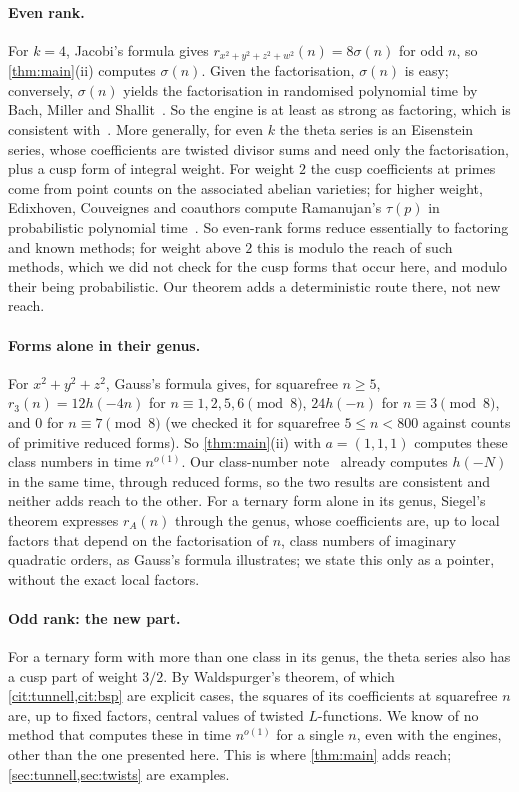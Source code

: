 \documentclass[10pt]{amsart}
\theoremstyle{plain}
\theoremstyle{definition}
\theoremstyle{remark}
\numberwithin{equation}{section}
\newcommand{\nr}{\dag}%
\begin{document}
\paragraph{Even rank.} For $k=4$, Jacobi's formula gives $r_{x^2+y^2+z^2+w^2}(n)=8\sigma(n)$ for odd $n$, so
\cref{thm:main}(ii) computes $\sigma(n)$. Given the factorisation, $\sigma(n)$ is easy; conversely,
$\sigma(n)$ yields the factorisation in randomised polynomial time by Bach, Miller and Shallit~\cite{BMS86}\nr.
So the engine is at least as strong as factoring, which is consistent with~\cite{RR26}. More generally, for even
$k$ the theta series is an Eisenstein series, whose coefficients are twisted divisor sums and need only the
factorisation, plus a cusp form of integral weight. For weight $2$ the cusp coefficients at primes come from point
counts on the associated abelian varieties; for higher weight, Edixhoven, Couveignes and coauthors compute
Ramanujan's $\tau(p)$ in probabilistic polynomial time~\cite{EC11}. So even-rank forms reduce essentially to
factoring and known methods; for weight above $2$ this is modulo the reach of such methods, which we did not check
for the cusp forms that occur here, and modulo their being probabilistic. Our theorem adds a deterministic route there, not new reach.

\paragraph{Forms alone in their genus.} For $x^2+y^2+z^2$, Gauss's formula gives, for squarefree $n\ge5$,
$r_3(n)=12h(-4n)$ for $n\equiv1,2,5,6\pmod8$, $24h(-n)$ for $n\equiv3\pmod8$, and $0$ for $n\equiv7\pmod8$
(we checked it for squarefree $5\le n<800$ against counts of primitive reduced forms). So
\cref{thm:main}(ii) with $a=(1,1,1)$ computes these class numbers in time $n^{o(1)}$. Our class-number
note~\cite{TulCN26} already computes $h(-N)$ in the same time, through reduced forms, so the two results are
consistent and neither adds reach to the other. For a ternary form alone in its genus, Siegel's theorem
expresses $r_A(n)$ through the genus, whose coefficients are, up to local factors that depend on the
factorisation of $n$, class numbers of imaginary quadratic orders, as Gauss's formula illustrates; we state this
only as a pointer, without the exact local factors.

\paragraph{Odd rank: the new part.} For a ternary form with more than one class in its genus, the theta series
also has a cusp part of weight $3/2$. By Waldspurger's theorem\nr, of which \cref{cit:tunnell,cit:bsp} are
explicit cases, the squares of its coefficients at squarefree $n$ are, up to fixed factors, central values of
twisted $L$-functions. We know
of no method that computes these in time $n^{o(1)}$ for a single $n$, even with the engines, other than the
one presented here. This is where \cref{thm:main} adds reach; \cref{sec:tunnell,sec:twists} are examples.
\end{document}
